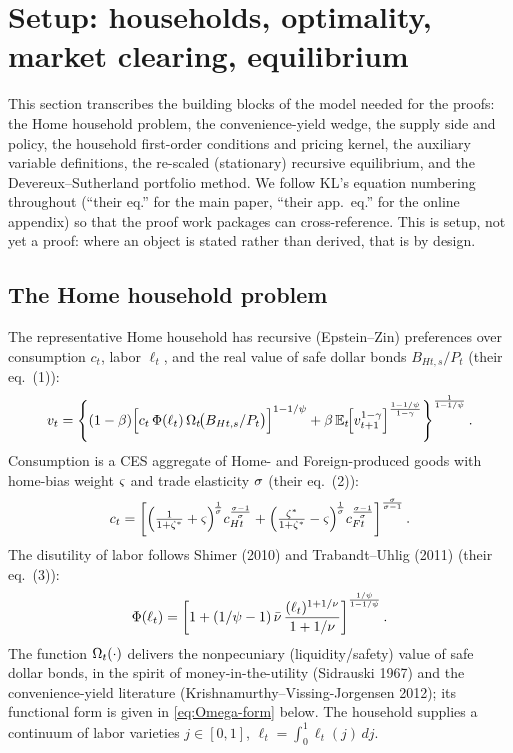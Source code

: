 \section{Setup: households, optimality, market clearing, equilibrium}
\label{sec:setup}

This section transcribes the building blocks of the model needed for the proofs:
the Home household problem, the convenience-yield wedge, the supply side and
policy, the household first-order conditions and pricing kernel, the auxiliary
variable definitions, the re-scaled (stationary) recursive equilibrium, and the
Devereux--Sutherland portfolio method. We follow KL's equation numbering
throughout (``their eq.'' for the main paper, ``their app.\ eq.'' for the online
appendix) so that the proof work packages can cross-reference. This is setup,
not yet a proof: where an object is stated rather than derived, that is by
design.

\subsection{The Home household problem}
\label{sec:hh-problem}

The representative Home household has recursive (Epstein--Zin) preferences over
consumption $c_t$, labor $\ell_t$, and the real value of safe dollar bonds
$B_{Ht,s}/P_t$ (their eq.~(1)):
\begin{equation}
\label{eq:ez-value}
v_t=\left\{(1-\beta)\Bigl[c_t\,\Phi(\ell_t)\,
\Omega_t\!\bigl(B_{Ht,s}/P_t\bigr)\Bigr]^{1-1/\psi}
+\beta\,\mathbb{E}_t\!\Bigl[v_{t+1}^{1-\gamma}\Bigr]^{\frac{1-1/\psi}{1-\gamma}}\right\}^{\frac{1}{1-1/\psi}}.
\end{equation}
Consumption is a CES aggregate of Home- and Foreign-produced goods with
home-bias weight $\varsigma$ and trade elasticity $\sigma$ (their eq.~(2)):
\begin{equation}
\label{eq:ces-c}
c_t=\left[\Bigl(\tfrac{1}{1+\zeta^{*}}+\varsigma\Bigr)^{\!\frac1{\sigma}}c_{Ht}^{\frac{\sigma-1}{\sigma}}
+\Bigl(\tfrac{\zeta^{*}}{1+\zeta^{*}}-\varsigma\Bigr)^{\!\frac1{\sigma}}c_{Ft}^{\frac{\sigma-1}{\sigma}}\right]^{\frac{\sigma}{\sigma-1}}.
\end{equation}
The disutility of labor follows Shimer (2010) and Trabandt--Uhlig (2011)
(their eq.~(3)):
\begin{equation}
\label{eq:labor-phi}
\Phi(\ell_t)=\left[1+(1/\psi-1)\,\bar{\nu}\,
\frac{(\ell_t)^{1+1/\nu}}{1+1/\nu}\right]^{\frac{1/\psi}{1-1/\psi}}.
\end{equation}
The function $\Omega_t(\cdot)$ delivers the nonpecuniary (liquidity/safety) value
of safe dollar bonds, in the spirit of money-in-the-utility (Sidrauski 1967) and
the convenience-yield literature (Krishnamurthy--Vissing-Jorgensen 2012); its
functional form is given in \eqref{eq:Omega-form} below. The household supplies a
continuum of labor varieties $j\in[0,1]$, $\ell_t=\int_0^1\ell_t(j)\,dj$.

